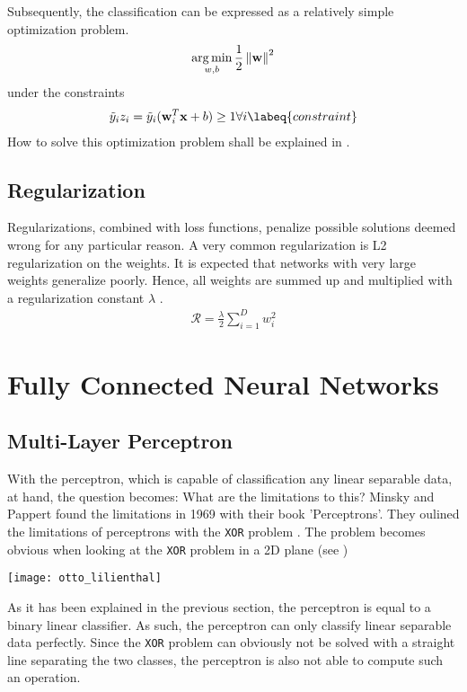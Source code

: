 Subsequently, the classification can be expressed as a relatively simple optimization problem.
\begin{align}
    \operatorname*{arg\,min}_{w, b} \frac{1}{2} \left\lVert\mathbf{w}\right\rVert^2
\end{align}
under the constraints
\begin{align}
    \tilde{y}_i z_i = \tilde{y}_i (\vec{w}_i^T \vec{x} + b) \geq 1 \forall i
    \labeq{constraint}
\end{align}
How to solve this optimization problem shall be explained in .

\subsection{Regularization}
Regularizations, combined with loss functions, penalize possible solutions deemed wrong for any particular reason.
A very common regularization is L2 regularization on the weights.
It is expected that networks with very large weights generalize poorly.
Hence, all weights are summed up and multiplied with a regularization constant $\lambda$ \cite{grosse}.
\begin{align}
	\mathcal{R} = \frac{\lambda}{2} \sum_{i = 1}^D w_i^2
\end{align}

\section{Fully Connected Neural Networks}
\subsection{Multi-Layer Perceptron}
With the perceptron, which is capable of classification any linear separable data, at hand, the question becomes: What are the limitations to this?
Minsky and Pappert found the limitations in 1969 with their book 'Perceptrons'.
They oulined the limitations of perceptrons with the \lstinline|XOR| problem \cite{perceptron}.
The problem becomes obvious when looking at the \lstinline|XOR| problem in a 2D plane (see )
\begin{marginfigure}
    \texttt{[image: otto\_lilienthal]}
    \caption[]{\lstinline|OR| and \lstinline|XOR| operations visualized. The \lstinline|XOR| problem cannot be solved by drawing a single line.}
\end{marginfigure}

As it has been explained in the previous section, the perceptron is equal to a binary linear classifier.
As such, the perceptron can only classify linear separable data perfectly.
Since the \lstinline|XOR| problem can obviously not be solved with a straight line separating the two classes, the perceptron is also not able to compute such an operation. 

